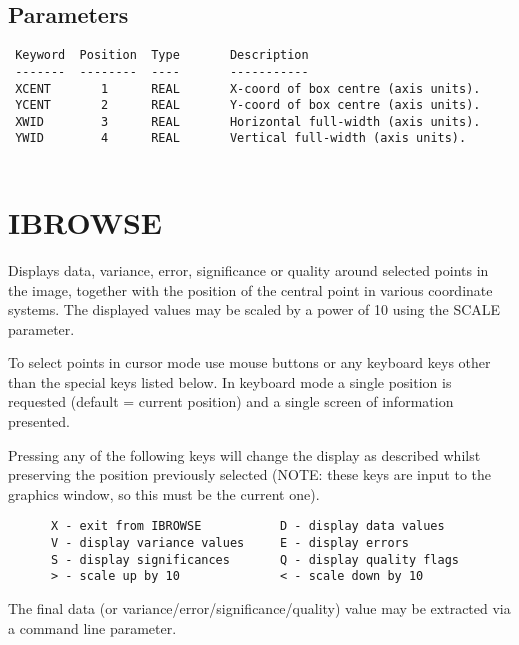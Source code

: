 \documentclass{book}
\renewcommand{\_}{{\tt\char'137}}     %
\begin{document}
\subsection{Parameters}
\begin{verbatim}
 Keyword  Position  Type       Description
 -------  --------  ----       -----------
 XCENT       1      REAL       X-coord of box centre (axis units).
 YCENT       2      REAL       Y-coord of box centre (axis units).
 XWID        3      REAL       Horizontal full-width (axis units).
 YWID        4      REAL       Vertical full-width (axis units).
 
\end{verbatim}\section{IBROWSE}
Displays data, variance, error, significance or quality around
selected points in the image, together with the position of
the central point in various coordinate systems. The displayed
values may be scaled by a power of 10 using the SCALE parameter.
 
To select points in cursor mode use mouse buttons or any keyboard
keys other than the special keys listed below. In keyboard mode a
single position is requested (default = current position) and a
single screen of information presented.
 
Pressing any of the following keys will change the display as
described whilst preserving the position previously selected
(NOTE: these keys are input to the graphics window, so this
must be the current one).
 
\begin{verbatim}
      X - exit from IBROWSE           D - display data values
      V - display variance values     E - display errors
      S - display significances       Q - display quality flags
      > - scale up by 10              < - scale down by 10
 \end{verbatim}
The final data (or variance/error/significance/quality) value may
be extracted via a command line parameter.
 
\end{document}
